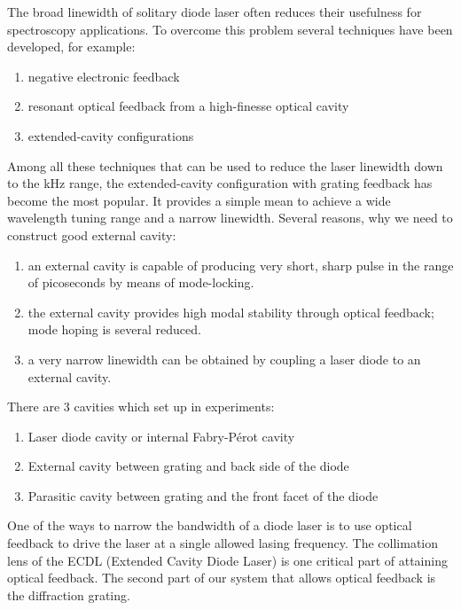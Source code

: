 The broad linewidth of solitary diode laser often reduces their usefulness for spectroscopy applications. To overcome this problem several techniques have been developed, for example:
\begin{enumerate}
\item negative electronic feedback
\item resonant optical feedback from a high-finesse optical cavity
\item extended-cavity configurations
\end{enumerate}
Among all these techniques that can be used to reduce the laser linewidth down to the kHz range, the extended-cavity configuration with grating feedback has become the most popular. It provides a simple mean to achieve a wide wavelength tuning range and a narrow linewidth.
Several reasons, why we need to construct good external cavity:
\begin{enumerate}
\item an external cavity is capable of producing very short, sharp pulse in the range of picoseconds by means of mode-locking.
\item the external cavity provides high modal stability through optical feedback; mode hoping is several reduced.
\item a very narrow linewidth can be obtained by coupling a laser diode to an external cavity.
\end{enumerate}
There are 3 cavities which set up in experiments:
\begin{enumerate}
\item Laser diode cavity or internal Fabry-P\'{e}rot cavity
\item External cavity between grating and back side of the diode 
\item Parasitic cavity between grating and the front facet of the diode
\end{enumerate}

One of the ways to narrow the bandwidth of a diode laser is to use optical feedback to drive the laser at a single allowed lasing frequency. The collimation lens of the ECDL (Extended Cavity Diode Laser) is one critical part of attaining optical feedback. The second part of our system that allows optical feedback is the diffraction  grating. 


